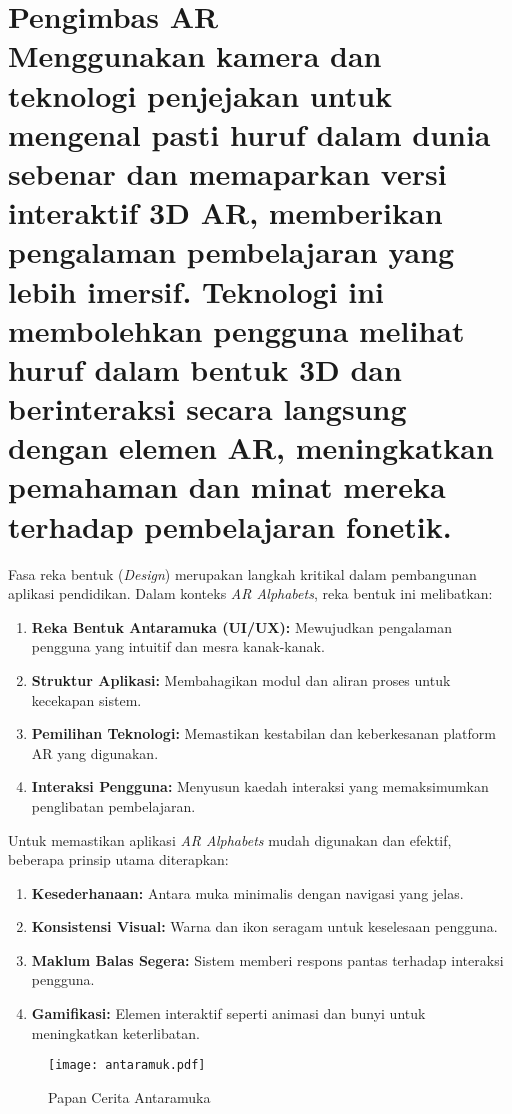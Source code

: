 \section{{Pengimbas AR} \\


Menggunakan kamera dan teknologi penjejakan untuk mengenal pasti huruf dalam dunia sebenar dan memaparkan versi interaktif 3D AR, memberikan pengalaman pembelajaran yang lebih imersif. Teknologi ini membolehkan pengguna melihat huruf dalam bentuk 3D dan berinteraksi secara langsung dengan elemen AR, meningkatkan pemahaman dan minat mereka terhadap pembelajaran fonetik.}
    Fasa reka bentuk (\textit{Design}) merupakan langkah kritikal dalam pembangunan aplikasi pendidikan. Dalam konteks \textit{AR Alphabets}, reka bentuk ini melibatkan:
\begin{enumerate}[label=\textendash]
    \item \textbf{Reka Bentuk Antaramuka (UI/UX):} Mewujudkan pengalaman pengguna yang intuitif dan mesra kanak-kanak.
    \item \textbf{Struktur Aplikasi:} Membahagikan modul dan aliran proses untuk kecekapan sistem.
    \item \textbf{Pemilihan Teknologi:} Memastikan kestabilan dan keberkesanan platform AR yang digunakan.
    \item \textbf{Interaksi Pengguna:} Menyusun kaedah interaksi yang memaksimumkan penglibatan pembelajaran.
\end{enumerate}

Untuk memastikan aplikasi \textit{AR Alphabets} mudah digunakan dan efektif, beberapa prinsip utama diterapkan:
\begin{enumerate}[label=\roman]
    \item \textbf{Kesederhanaan:} Antara muka minimalis dengan navigasi yang jelas.
    \item \textbf{Konsistensi Visual:} Warna dan ikon seragam untuk keselesaan pengguna.
    \item \textbf{Maklum Balas Segera:} Sistem memberi respons pantas terhadap interaksi pengguna.
    \item \textbf{Gamifikasi:} Elemen interaktif seperti animasi dan bunyi untuk meningkatkan keterlibatan.
\end{enumerate}
\clearpage

\begin{figure}[h]
    \centering
    \texttt{[image: antaramuk.pdf]}
    \caption{Papan Cerita Antaramuka}
    \label{fig:enterlabel}
\end{figure}
\clearpage
